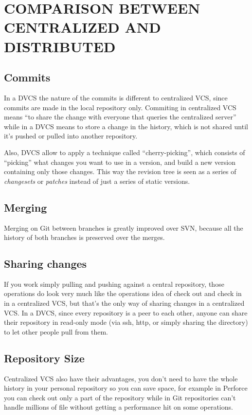 \section{COMPARISON BETWEEN CENTRALIZED AND DISTRIBUTED}
\subsection{Commits}
In a DVCS the nature of the commits is different to centralized VCS, since commits are made in the local repository only. 
Commiting in centralized VCS means ``to share the change with everyone that queries the centralized server'' while in a 
DVCS means to store a change in the history, which is not shared until it's pushed or pulled into another repository.

Also, DVCS allow to apply a technique called ``cherry-picking'', 
which consists of ``picking'' what changes you want to use in a version, and build 
a new version containing only those changes. This way the revision tree is seen as a 
series of \emph{changesets} or \emph{patches} instead of just a series of static versions.

\subsection{Merging}
Merging on Git between branches is greatly improved over SVN, because all the history of 
both branches is preserved over the merges. %

\subsection{Sharing changes}
If you work simply pulling and pushing against a central repository, those operations do look 
very much like the operations idea of check out and check in in a centralized VCS, 
but that's the only way of sharing changes in a centralized VCS.
In a DVCS, since every repository is a peer to each other, anyone can share their repository in 
read-only mode (via ssh, http, or simply sharing the directory) to let other people pull from them. 

\subsection{Repository Size}

Centralized VCS also have their advantages, you don't need to have the whole history in your 
personal repository so you can save space, for example in Perforce you can check out only a part of the 
repository\cite{perforceclientspec} while in Git repositories can't handle millions of file 
without getting a performance hit on some operations\cite{linusgit}.

